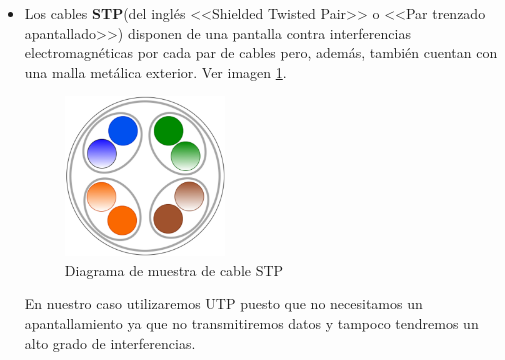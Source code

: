 \begin{itemize}
\item Los cables \textbf{STP}(del inglés <<Shielded Twisted Pair>> o <<Par trenzado apantallado>>) disponen de una pantalla contra interferencias electromagnéticas por cada par de cables pero, además, también cuentan con una malla metálica exterior. Ver imagen \ref{Img:Muestra STP}.
\begin{figure}
    \centering
    \includegraphics[width=0.4\textwidth]{img/STP.pdf}
    \caption{Diagrama de muestra de cable STP} \label{Img:Muestra STP}
\end{figure}

En nuestro caso utilizaremos UTP puesto que no necesitamos un apantallamiento ya que no transmitiremos datos y tampoco tendremos un alto grado de interferencias.

\end{itemize}

